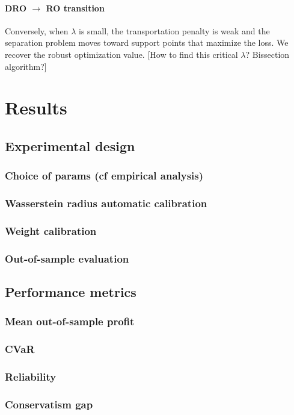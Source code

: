 \documentclass[11pt]{article}
\theoremstyle{plain}
\theoremstyle{definition}
\begin{document}
\paragraph{DRO $\to$ RO transition}
Conversely, when $\lambda$ is small, the transportation penalty is weak and the separation problem moves toward support points that maximize the loss. 
We recover the robust optimization value.
\color{red}[How to find this critical $\lambda$? Bissection algorithm?]\color{black}

\section{Results}
\subsection{Experimental design}
\subsubsection{Choice of params (cf empirical analysis)}
\subsubsection{Wasserstein radius automatic calibration}
\subsubsection{Weight calibration}
\subsubsection{Out-of-sample evaluation}
\subsection{Performance metrics}
\subsubsection{Mean out-of-sample profit}
\subsubsection{CVaR}
\subsubsection{Reliability}
\subsubsection{Conservatism gap}
\end{document}
